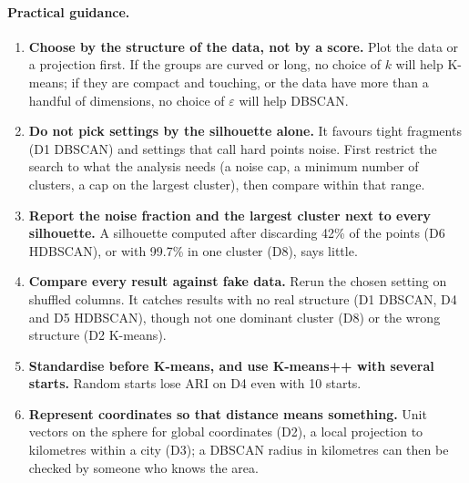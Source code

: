 \paragraph{Practical guidance.}
\begin{enumerate}\itemsep1pt
\item \textbf{Choose by the structure of the data, not by a score.} Plot the data or a projection first.
If the groups are curved or long, no choice of $k$ will help K-means; if they are compact and touching,
or the data have more than a handful of dimensions, no choice of $\varepsilon$ will help DBSCAN.
\item \textbf{Do not pick settings by the silhouette alone.} It favours tight fragments (D1 DBSCAN) and
settings that call hard points noise. First restrict the search to what the analysis needs (a noise cap,
a minimum number of clusters, a cap on the largest cluster), then compare within that range.
\item \textbf{Report the noise fraction and the largest cluster next to every silhouette.} A silhouette
computed after discarding 42\% of the points (D6 HDBSCAN), or with 99.7\% in one cluster (D8), says little.
\item \textbf{Compare every result against fake data.} Rerun the chosen setting on shuffled columns. It
catches results with no real structure (D1 DBSCAN, D4 and D5 HDBSCAN), though not one dominant cluster
(D8) or the wrong structure (D2 K-means).
\item \textbf{Standardise before K-means, and use K-means++ with several starts.} Random starts lose ARI on
D4 even with 10 starts.
\item \textbf{Represent coordinates so that distance means something.} Unit vectors on the sphere for
global coordinates (D2), a local projection to kilometres within a city (D3); a DBSCAN radius in
kilometres can then be checked by someone who knows the area.
\end{enumerate}
